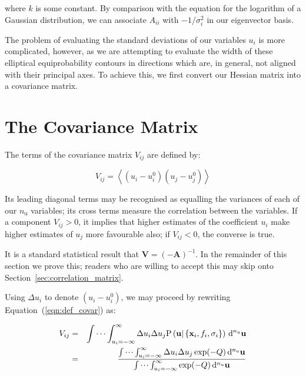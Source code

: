\noindent where $k$ is some constant. By comparison with the equation for the
logarithm of a Gaussian distribution, we can associate $A_{ii}$ with
$-1/\sigma_i^2$ in our eigenvector basis.

The problem of evaluating the standard deviations of our variables $u_i$ is
more complicated, however, as we are attempting to evaluate the width of these
elliptical equiprobability contours in directions which are, in general, not
aligned with their principal axes. To achieve this, we first convert our
Hessian matrix into a covariance matrix.

\section{The Covariance Matrix}

The terms of the covariance matrix $V_{ij}$ are defined by:

\begin{equation}
V_{ij} = \left< \left(u_i - u^0_i\right) \left(u_j - u^0_j\right) \right>
\label{eqn:def_covar}
\end{equation}

\noindent Its leading diagonal terms may be recognised as equalling the
variances of each of our $n_\mathrm{u}$ variables; its cross terms measure the
correlation between the variables. If a component $V_{ij} > 0$, it implies that
higher estimates of the coefficient $u_i$ make higher estimates of $u_j$ more
favourable also; if $V_{ij} < 0$, the converse is true.

It is a standard statistical result that $\mathbf{V} = (-\mathbf{A})^{-1}$. In
the remainder of this section we prove this; readers who are willing to accept
this may skip onto Section~\ref{sec:correlation_matrix}.

Using $\Delta u_i$ to denote $\left(u_i - u^0_i\right)$, we may proceed by
rewriting Equation~(\ref{eqn:def_covar}) as:

\begin{eqnarray}
V_{ij} & = & \idotsint_{u_i=-\infty}^{\infty}
\Delta u_i \Delta u_j
\mathrm{P}\left(
\mathbf{u} | \left\{ \mathbf{x}_i, f_i, \sigma_i \right\} \right)
\,\mathrm{d}^{n_\mathrm{u}}\mathbf{u} \\
 & = & \frac{
\idotsint_{u_i=-\infty}^{\infty} \Delta u_i \Delta u_j \exp(-Q) \,\mathrm{d}^{n_\mathrm{u}}\mathbf{u}
}{
\idotsint_{u_i=-\infty}^{\infty} \exp(-Q) \,\mathrm{d}^{n_\mathrm{u}}\mathbf{u}
}
\nonumber
\end{eqnarray}

